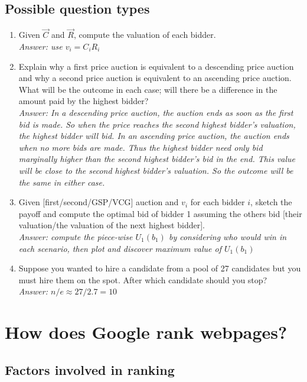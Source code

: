\documentclass{article}
\begin{document}
\subsection{Possible question types}

\begin{enumerate}
\item Given $\vec C$ and $\vec R$, compute the valuation of each bidder. \\
\textit{Answer: use $v_i = C_iR_i$}
\item Explain why a first price auction is equivalent to a descending price auction and why a second price auction is equivalent to an ascending price auction. What will be the outcome in each case; will there be a difference in the amount paid by the highest bidder? \\
\textit{Answer: In a descending price auction, the auction ends as soon as the first bid is made. So when the price reaches the second highest bidder's valuation, the highest bidder will bid. In an ascending price auction, the auction ends when no more bids are made. Thus the highest bidder need only bid marginally higher than the second highest bidder's bid in the end. This value will be close to the second highest bidder's valuation. So the outcome will be the same in either case.}
\item Given [first/second/GSP/VCG] auction and $v_i$ for each bidder $i$, sketch the payoff and compute the optimal bid of bidder 1 assuming the others bid [their valuation/the valuation of the next highest bidder]. \\
\textit{Answer: compute the piece-wise $U_1(b_1)$ by considering who would win in each scenario, then plot and discover maximum value of $U_1(b_1)$}
\item Suppose you wanted to hire a candidate from a pool of 27 candidates but you must hire them on the spot. After which candidate should you stop? \\
\textit{Answer: $n/e \approx 27/2.7 = 10$} \\
\end{enumerate}

\section{How does Google rank webpages?}

\subsection{Factors involved in ranking}
\end{document}
